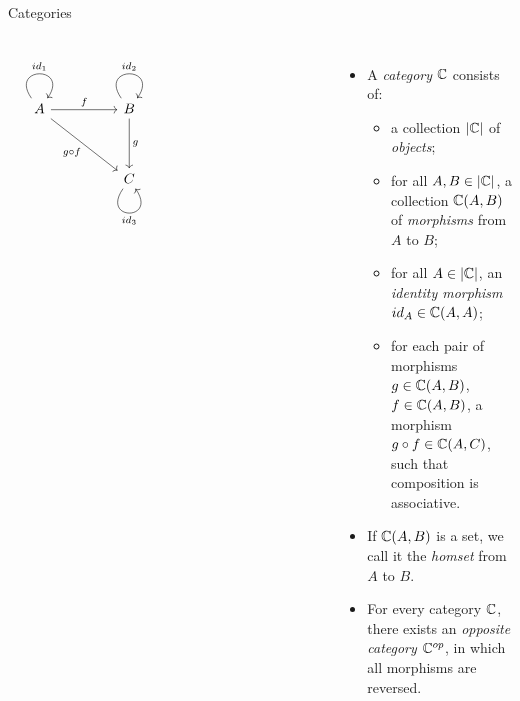 \begin{frame}[fragile]{Categories}
\begin{columns}
\[\begin{tikzcd}
	A && B \\
	\\
	&& C &&&&& {}
	\arrow["{id_1}", from=1-1, to=1-1, loop, in=55, out=125, distance=10mm]
	\arrow["f", from=1-1, to=1-3]
	\arrow["{g \circ f}"', from=1-1, to=3-3]
	\arrow["{id_2}", from=1-3, to=1-3, loop, in=55, out=125, distance=10mm]
	\arrow["g", from=1-3, to=3-3]
	\arrow["{id_3}"', from=3-3, to=3-3, loop, in=305, out=235, distance=10mm]
\end{tikzcd}\]
\begin{itemize}
 \item


A \textit{category} $\mathbb{C}$ consists of:
\begin{itemize}
 \pause\item a collection $|\mathbb{C}|$ of \textit{objects};
 \pause\item for all $A, B \in |\mathbb{C}|$, a collection $\mathbb{C}(A, B)$ of \textit{morphisms} from $A$ to $B$;
 \pause\item for all $A \in |\mathbb{C}|$, an \textit{identity morphism} $id_A \in \mathbb{C}(A, A)$;
 \pause\item for each pair of morphisms $g \in \mathbb{C}(A,B)$, $f \in \mathbb{C}(A,B)$, a morphism $g \circ f \in \mathbb{C}(A,C)$, such that composition is associative.
\end{itemize}
\pause\item If $\mathbb{C}(A, B)$ is a set, we call it the \textit{homset} from $A$ to $B$.
\pause\item For every category $\mathbb{C}$, there exists an \textit{opposite category} $\mathbb{C}^{op}$, in which all morphisms are reversed.
\end{itemize}
\end{columns}
\end{frame}
